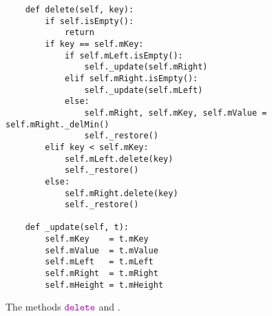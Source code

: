 \begin{figure}[!ht]
\centering
\begin{verbatim}
    def delete(self, key):
        if self.isEmpty():
            return
        if key == self.mKey:
            if self.mLeft.isEmpty():
                self._update(self.mRight)
            elif self.mRight.isEmpty():
                self._update(self.mLeft)
            else:
                self.mRight, self.mKey, self.mValue = self.mRight._delMin()
                self._restore()
        elif key < self.mKey:
            self.mLeft.delete(key)
            self._restore()
        else:
            self.mRight.delete(key)
            self._restore() 

    def _update(self, t):
        self.mKey    = t.mKey
        self.mValue  = t.mValue
        self.mLeft   = t.mLeft
        self.mRight  = t.mRight
        self.mHeight = t.mHeight            
\end{verbatim}
\vspace*{-0.3cm}
\caption{The methods $\mytt{delete}$ and .}
\label{fig:avl-tree.ipython:delete}
\end{figure}
